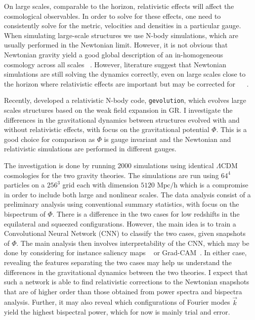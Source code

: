 
On large scales, comparable to the horizon, relativistic effects will affect the cosmological observables. In order to solve for these effects, one need to consistently solve for the metric, velocities and densities in a particular gauge. When simulating large-scale structures we use N-body simulations, which are usually performed in the Newtonian limit. However, it is not obvious that Newtonian gravity yield a good global description of an in-homogeneous cosmology across all scales ~\parencite{jeong_large-scale_2012}. However, literature suggest that Newtonian simulations are still solving the dynamics correctly, even on large scales close to the horizon where relativistic effects are important but may be corrected for ~\parencite{chisari_connection_2011} ~\parencite{green_newtonian_2012}.


Recently, \cite{adamek_gevolution_2016} developed a relativistic N-body code, \texttt{gevolution}, which evolves large scales structures based on the weak field expansion in GR. I investigate the differences in the gravitational dynamics between structures evolved with and without relativistic effects, with focus on the gravitational potential $\Phi$. This is a good choice for comparison as $\Phi$ is gauge invariant and the Newtonian and relativistic simulations are performed in different gauges.

The investigation is done by running 2000 simulations using identical $\Lambda$CDM cosmologies for the two gravity theories. The simulations are run using $64^4$ particles on a $256^3$ grid each with dimension $5120\text{ Mpc/h}$ which is a compromise in order to include both large and nonlinear scales. The data analysis consist of a preliminary analysis using conventional summary statistics, with focus on the bispectrum of $\Phi$. There is a difference in the two cases for low redshifts in the equilateral and squeezed configurations. However, the main idea is to train a Convolutional Neural Network (CNN) to classify the two cases, given snapshots of $\Phi$. The main analysis then involves interpretability of the CNN, which may be done by considering for instance saliency maps ~\parencite{alqaraawi_evaluating_2020} or Grad-CAM~\parencite{selvaraju_grad-cam_2020}. In either case, revealing the features separating the two cases may help us understand the differences in the gravitational dynamics between the two theories. I expect that such a network is able to find relativistic corrections to the Newtonian snapshots that are of higher order than those obtained from power spectra and bispectra analysis. Further, it may also reveal which configurations of Fourier modes $\vec{k}$ yield the highest bispectral power, which for now is mainly trial and error.  

